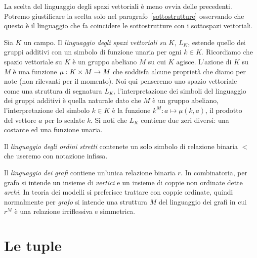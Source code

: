 \begin{example}\label{linguaggio_spazi_vettoriali}
La scelta del linguaggio degli spazi vettoriali \`e meno ovvia delle precedenti. Potremo giustificare la scelta solo nel paragrafo~\ref{sottostrutture} osservando che questo \`e il linguaggio che fa coincidere le sottostrutture con i sottospazi vettoriali. 

Sia $K$ un campo. Il \emph{linguaggio degli spazi vettoriali su $K$\/}, $L_K$, estende quello dei gruppi additivi con un simbolo di funzione unaria per ogni $k\in K$. Ricordiamo che spazio vettoriale su $K$ \`e un gruppo abeliano $M$ su cui $K$ agisce. L'azione di $K$ su $M$ \`e una funzione $\mu:K\times M\rightarrow M$ che soddisfa alcune propriet\`a che diamo per note (non rilevanti per il momento). Noi qui penseremo uno spazio vettoriale come una struttura di segnatura $L_K$, l'interpretazione dei simboli del linguaggio dei gruppi additivi \`e quella naturale dato che $M$ \`e un gruppo abeliano, l'interpretazione del simbolo $k\in K$ \`e la funzione $k^M: a\mapsto \mu(k, a)$, il prodotto del vettore $a$ per lo scalate $k$. Si noti che $L_K$ contiene due zeri diversi: una costante ed una funzione unaria.
\end{example}

\begin{example}
Il \emph{linguaggio degli ordini stretti} contenete un solo simbolo di relazione binaria $<$ che useremo con notazione infissa.
\end{example}

\begin{example}
Il \emph{linguaggio dei grafi} contiene un'unica relazione binaria $r$. In combinatoria, per grafo si intende un insieme di \textit{vertici\/} e un insieme di coppie non ordinate dette \textit{archi}. In teoria dei modelli si preferisce trattare con coppie ordinate, quindi normalmente per \emph{grafo\/} si intende una struttura $M$ del linguaggio dei grafi in cui $r^M$ \`e una relazione irriflessiva e simmetrica.
\end{example}

\section{Le tuple}

